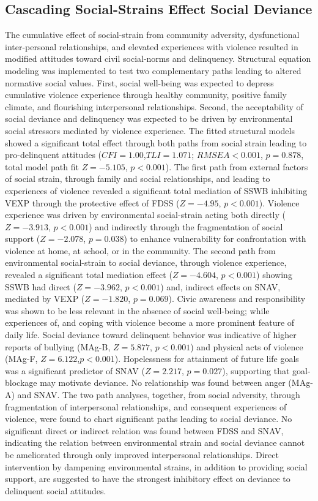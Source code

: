 \documentclass[utf8]{article}
\begin{document}
\subsection{Cascading Social-Strains Effect Social Deviance}
The cumulative effect of social-strain from community adversity, dysfunctional inter-personal relationships, and elevated experiences with violence resulted in modified attitudes toward civil social-norms and delinquency. Structural equation modeling was implemented to test two complementary paths leading to altered normative social values. First, social well-being was expected to depress cumulative violence experience through healthy community, positive family climate, and flourishing interpersonal relationships. Second, the acceptability of social deviance and delinquency was expected to be driven by environmental social stressors mediated by violence experience. The fitted structural models showed a significant total effect through both paths from social strain leading to pro-delinquent attitudes ($CFI=1.00$,$TLI=1.071$; $RMSEA<0.001$, $p=0.878$, total model path fit $Z=-5.105$, $p<0.001$). The first path from external factors of social strain, through family and social relationships, and leading to experiences of violence revealed a significant total mediation of SSWB inhibiting VEXP through the protective effect of FDSS ($Z=-4.95$, $p<0.001$). Violence experience was driven by environmental social-strain acting both directly ($Z=-3.913$, $p<0.001$) and indirectly through the fragmentation of social support ($Z=-2.078$, $p=0.038$) to enhance vulnerability for confrontation with violence at home, at school, or in the community. The second path from environmental social-strain to social deviance, through violence experience, revealed a significant total mediation effect  ($Z=-4.604$, $p<0.001$) showing SSWB had direct ($Z=-3.962$, $p<0.001$) and, indirect effects on SNAV, mediated by VEXP ($Z=-1.820$, $p=0.069$). Civic awareness and responsibility was shown to be less relevant in the absence of social well-being; while experiences of, and coping with violence become a more prominent feature of daily life. Social deviance toward delinquent behavior was indicative of higher reports of bullying (MAg-B, $Z=5.877$, $p<0.001$) and physical acts of violence (MAg-F, $Z=6.122$,$p<0.001$). Hopelessness for attainment of future life goals was a significant predictor of SNAV ($Z=2.217$, $p=0.027$), supporting that goal-blockage may motivate deviance. No relationship was found between anger (MAg-A) and SNAV. The two path analyses, together, from social adversity, through fragmentation of interpersonal relationships, and consequent experiences of violence, were found to chart significant paths leading to social deviance. No significant direct or indirect relation was found between FDSS and SNAV, indicating the relation between environmental strain and social deviance cannot be ameliorated through only improved interpersonal relationships. Direct intervention by dampening environmental strains, in addition to providing social support, are suggested to have the strongest inhibitory effect on deviance to delinquent social attitudes. 
\end{document}

